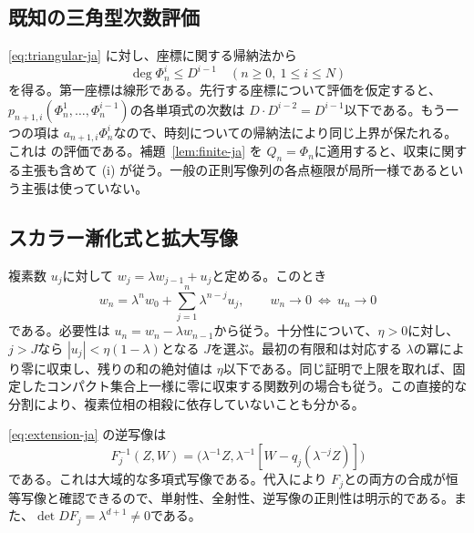 \documentclass[12pt]{amsart}
\theoremstyle{definition}
\theoremstyle{remark}
\numberwithin{equation}{section}
\begin{document}
\subsection{既知の三角型次数評価}
\eqref{eq:triangular-ja} に対し、座標に関する帰納法から
\begin{equation}\label{eq:degree-ja}
\deg\Phi_n^i\leq D^{i-1}\quad(n\geq0,\ 1\leq i\leq N)
\end{equation}
を得る。第一座標は線形である。先行する座標について評価を仮定すると、\allowbreak$p_{n+1,i}(\Phi_n^1,\ldots,\Phi_n^{i-1})$\allowbreak の各単項式の次数は \allowbreak$D\cdot D^{i-2}=D^{i-1}$\allowbreak 以下である。もう一つの項は \allowbreak$a_{n+1,i}\Phi_n^i$\allowbreak なので、時刻についての帰納法により同じ上界が保たれる。これは \cite[Lemma 1]{AS-ja} の評価である。補題~\ref{lem:finite-ja} を \allowbreak$Q_n=\Phi_n$\allowbreak に適用すると、収束に関する主張も含めて (i) が従う。一般の正則写像列の各点極限が局所一様であるという主張は使っていない。

\subsection{スカラー漸化式と拡大写像}
複素数 \allowbreak$u_j$\allowbreak に対して \allowbreak$w_j=\lambda w_{j-1}+u_j$\allowbreak と定める。このとき
\begin{equation}\label{eq:convolution-ja}
w_n=\lambda^nw_0+\sum_{j=1}^n\lambda^{n-j}u_j,
\qquad
w_n\to0\ \Longleftrightarrow\ u_n\to0
\end{equation}
である。必要性は \allowbreak$u_n=w_n-\lambda w_{n-1}$\allowbreak から従う。十分性について、\allowbreak$\eta>0$\allowbreak に対し、\allowbreak$j>J$\allowbreak なら \allowbreak$|u_j|<\eta(1-\lambda)$\allowbreak となる \allowbreak$J$\allowbreak を選ぶ。最初の有限和は対応する \allowbreak$\lambda$\allowbreak の冪により零に収束し、残りの和の絶対値は \allowbreak$\eta$\allowbreak 以下である。同じ証明で上限を取れば、固定したコンパクト集合上一様に零に収束する関数列の場合も従う。この直接的な分割により、複素位相の相殺に依存していないことも分かる。

\eqref{eq:extension-ja} の逆写像は
\begin{equation}\label{eq:inverse-ja}
F_j^{-1}(Z,W)=\bigl(\lambda^{-1}Z,
\lambda^{-1}[W-q_j(\lambda^{-j}Z)]\bigr)
\end{equation}
である。これは大域的な多項式写像である。代入により \allowbreak$F_j$\allowbreak との両方の合成が恒等写像と確認できるので、単射性、全射性、逆写像の正則性は明示的である。また、\allowbreak$\det DF_j=\lambda^{d+1}\ne0$\allowbreak である。
\end{document}
